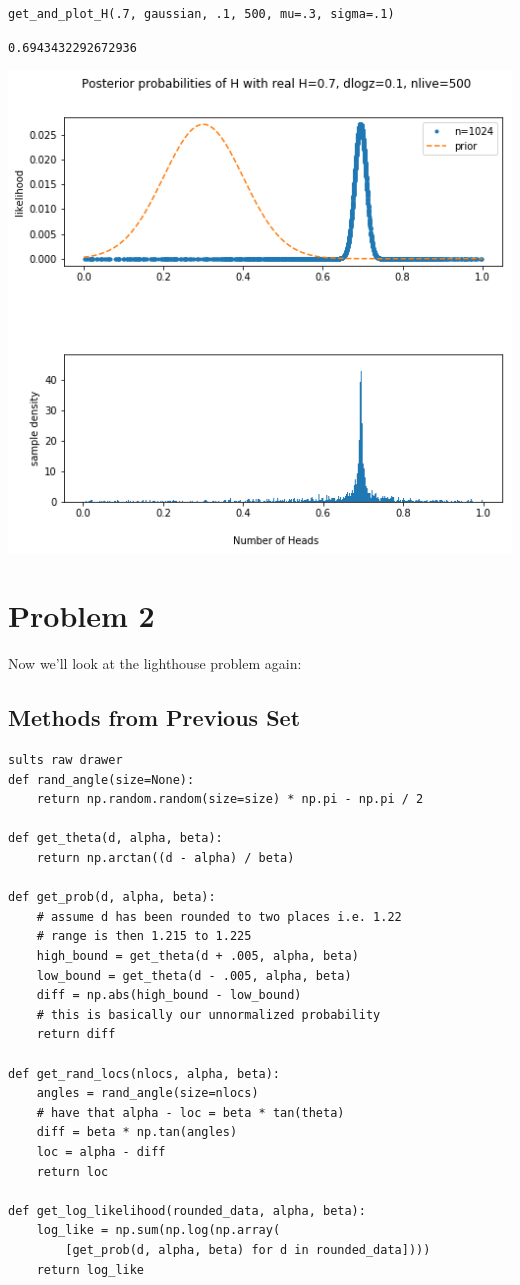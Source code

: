 \documentclass[11pt]{article}
\begin{document}
\begin{verbatim}
get_and_plot_H(.7, gaussian, .1, 500, mu=.3, sigma=.1)
\end{verbatim}

\begin{verbatim}
0.6943432292672936
\end{verbatim}
\includegraphics[width=.9\linewidth]{./obipy-resources/6925rI.png}

\section*{Problem 2}
\label{sec-2}
Now we'll look at the lighthouse problem again:

\subsection*{Methods from Previous Set}
\label{sec-2-1}

\begin{verbatim}
sults raw drawer
def rand_angle(size=None):
    return np.random.random(size=size) * np.pi - np.pi / 2

def get_theta(d, alpha, beta):
    return np.arctan((d - alpha) / beta)

def get_prob(d, alpha, beta):
    # assume d has been rounded to two places i.e. 1.22
    # range is then 1.215 to 1.225
    high_bound = get_theta(d + .005, alpha, beta)
    low_bound = get_theta(d - .005, alpha, beta)
    diff = np.abs(high_bound - low_bound)
    # this is basically our unnormalized probability
    return diff
    
def get_rand_locs(nlocs, alpha, beta):
    angles = rand_angle(size=nlocs)
    # have that alpha - loc = beta * tan(theta)
    diff = beta * np.tan(angles)
    loc = alpha - diff
    return loc

def get_log_likelihood(rounded_data, alpha, beta):
    log_like = np.sum(np.log(np.array(
        [get_prob(d, alpha, beta) for d in rounded_data])))
    return log_like
\end{verbatim}
\end{document}
